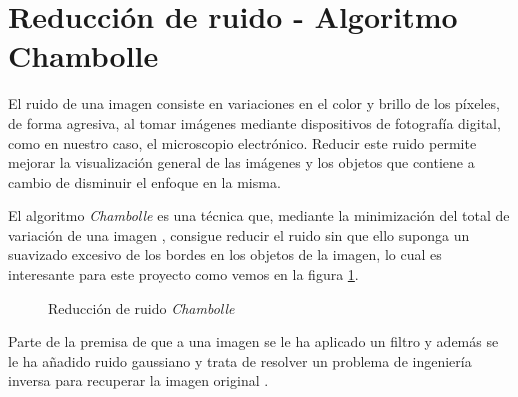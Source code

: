 \section{Reducción de ruido - Algoritmo Chambolle}
\label{ReduccionRuido}
El ruido de una imagen \cite{wiki:ImageNoise} consiste en variaciones en el color y brillo de los píxeles, de forma agresiva, al tomar imágenes mediante dispositivos de fotografía digital, como en nuestro caso, el microscopio electrónico. Reducir este ruido permite mejorar la visualización general de las imágenes y los objetos que contiene a cambio de disminuir el enfoque en la misma.

El algoritmo \textit{Chambolle} \cite{chambolle2004algorithm} es una técnica que, mediante la minimización del total de variación de una imagen \cite{wiki:TotalVariation}, consigue reducir el ruido sin que ello suponga un suavizado excesivo de los bordes en los objetos de la imagen, lo cual es interesante para este proyecto como vemos en la figura \ref{fig:chambolle}.

\begin{figure}[H]
\centering
{}
\caption{Reducción de ruido \textit{Chambolle}}
\label{fig:chambolle}
\end{figure}

Parte de la premisa de que a una imagen se le ha aplicado un filtro y además se le ha añadido ruido gaussiano \cite{wiki:gaussianNoise} y trata de resolver un problema de ingeniería inversa para recuperar la imagen original \cite{articuloTotalVariation}.

